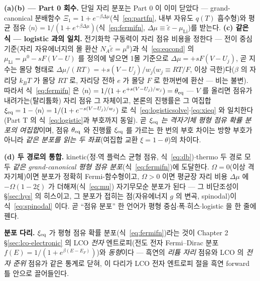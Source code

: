 \textbf{(a)(b) --- Part 0 회수.} 단일 자리 분포는 Part 0 이 이미 닫았다 --- grand-canonical
분배함수 $\Xi_1=1+e^{-\beta\Delta\mu}$(식~\eqref{eq:partfn}, 내부 자유도 $q(T)$ 흡수형)와 평균 점유
$\langle n\rangle=1/(1+e^{+\beta\Delta\mu})$(식~\eqref{eq:fermifn},
$\Delta\mu\equiv\tilde\varepsilon-\mu_\mathrm{Li}$)를 받는다. \textbf{(c) 같은 식 --- logistic 과의 일치.}
전기화학 구동력이 자리 점유 비용을 정한다 --- 전이 중심 기준(자리 자유에너지의 몰 환산 $N_A\tilde\varepsilon=\mu^0$)과
식~\eqref{eq:eqcond} 의 $\mu_\mathrm{Li}=\mu^0-sF(V-U)$ 를 정의에 넣으면 1몰 기준으로
$\Delta\mu=+sF(V-U_j)$, 곧 지수는 몰당 형태로
$\Delta\mu/(RT)=+s(V-U_j)/w_j$($w_j\equiv RT/F$, 이상 극한)다($\beta$ 의 자리당 $k_BT$ 가 몰당 $RT$ 로,
자리당 전하 $e$ 가 몰당 $F$ 로 한꺼번에 환산 --- 비는 불변). 따라서 식~\eqref{eq:fermifn} 은
$\langle n\rangle=1/(1+e^{+s(V-U_j)/w_j})=\theta_{\mathrm{eq}}$ --- $V$ 를 올리면 점유가 내려가는(탈리튬화) 자리 점유
그 자체이고, 본론의 진행률은 그 여집합 $\xi_{\mathrm{eq}}=1-\langle n\rangle=1/(1+e^{-s(V-U_j)/w_j})$ 로
식~\eqref{eq:logisticsolve}$\cdot$\eqref{eq:xieq} 와 일치한다(Part T 의 식~\eqref{eq:logistic}과 부호까지 동일).
곧 \emph{$\xi_{\mathrm{eq}}$ 는 격자기체 평형 점유 확률 분포의 여집합}이며, 점유 $\theta_{\mathrm{eq}}$ 와 진행률 $\xi_{\mathrm{eq}}$ 를
가르는 한 번의 부호 차이는 방향 부호가 아니라 \emph{같은 분포를 읽는 두 좌표}(여집합 교환
$\xi=1-\theta$)의 차이다.

\textbf{(d) 두 경로의 통합.} kinetic(정$\cdot$역 플럭스 균형 점유, 식~\eqref{eq:db})$\cdot$thermo 두 경로
모두 \emph{같은 grand-canonical 평형 점유 분포}(식~\eqref{eq:fermifn})에 도달한다. $\Omega=0$(이상 격자기체)이면 분포가 정확히 Fermi-함수형이고, $\Omega>0$
이면 평균장 자리 비용 $\Delta\mu$ 에 $-\Omega(1-2\xi)$ 가 더해져(식~\eqref{eq:mu}) 자기무모순 분포가 된다 --- 그
비단조성이 \S\ref{sec:hys} 의 히스이고, 그 분포가 접히는 점(자유에너지 $g$ 의 변곡, spinodal)이 식~\eqref{eq:spinodal} 이다. 곧 ``점유 분포''
한 언어가 평형 중심$\cdot$폭$\cdot$히스$\cdot$logistic 을 한 줄에 꿴다.

\begin{keybox}
\textbf{분포 다리.} $\xi_{\mathrm{eq}}$ 가 평형 점유 확률 분포(식~\eqref{eq:fermifn})라는 것이 Chapter 2 \S\ref{sec:lco-electronic}
의 LCO \emph{전자} 엔트로피(전도 전자 Fermi--Dirac 분포 $f(E)=1/(1+e^{\beta(E-E_F)})$)와 \emph{동형}이다 ---
흑연의 \emph{리튬 자리} 점유와 LCO 의 \emph{전자 준위} 점유가 같은 통계로 닫혀, 이 다리가 LCO 전자 엔트로피
절을 흑연 forward 틀 안으로 끌어들인다.
\end{keybox}

